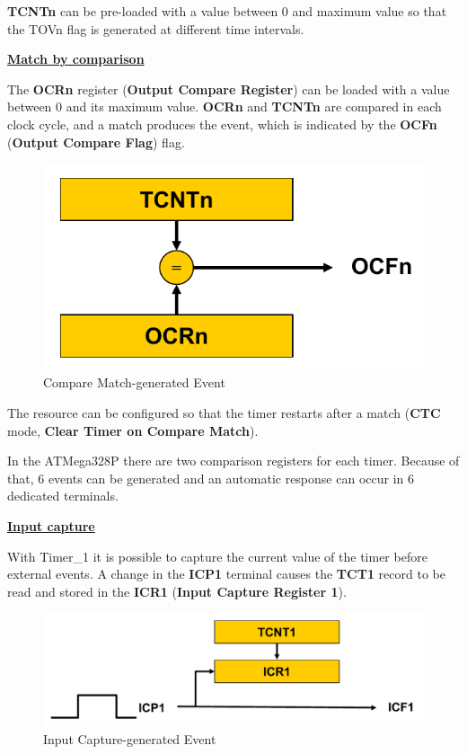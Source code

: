 \textbf{TCNTn} can be pre-loaded with a value between 0 and maximum value so that the TOVn flag is generated at different time intervals.

\clearpage

\medskip
\underline{\textbf{Match by comparison}}
\medskip

The \textbf{OCRn }register (\textbf{Output Compare Register}) can be loaded with a value between 0 and its maximum value. \textbf{OCRn} and \textbf{TCNTn} are compared in each clock cycle, and a match produces the event, which is indicated by the \textbf{OCFn} (\textbf{Output Compare Flag}) flag.


\begin{figure}[H]
    \centering
    \includegraphics[scale = 0.75]{Graphics/MICROS/Practice 4/SLIDES/COMP_MATCH.pdf}
    \caption{Compare Match-generated Event~\autocite{SLIDES_MICROS}}
    \label{fig:COMPARE_MATCH}
\end{figure}

The resource can be configured so that the timer restarts after a match (\textbf{CTC} mode, \textbf{Clear Timer on Compare Match}).\medskip

In the ATMega328P there are two comparison registers for each timer. Because of that, 6 events can be generated and an automatic response can occur in 6 dedicated terminals.


\medskip
\underline{\textbf{Input capture}}
\medskip

With Timer\_1 it is possible to capture the current value of the timer before external events. A change in the \textbf{ICP1} terminal causes the \textbf{TCT1} record to be read and stored in the \textbf{ICR1} (\textbf{Input Capture Register 1}).

\begin{figure}[H]
    \centering
    \includegraphics[width = \textwidth]{Graphics/MICROS/Practice 4/SLIDES/INPUT_CAPT.pdf}
    \caption{Input Capture-generated Event~\autocite{SLIDES_MICROS}}
    \label{fig:INPUT_CAPTURE}
\end{figure}

